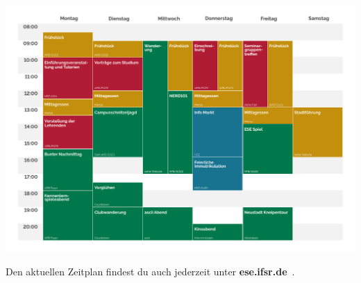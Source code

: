%
  \begin{landscape}

\includegraphics[scale=0.8]{timetable/zeitplan.pdf}%
  \enlargethispage{3em}
%
%
\begin{center}
  Den aktuellen Zeitplan findest du auch jederzeit unter
  \textbf{ese.ifsr.de}~.
\end{center}
  \end{landscape}
